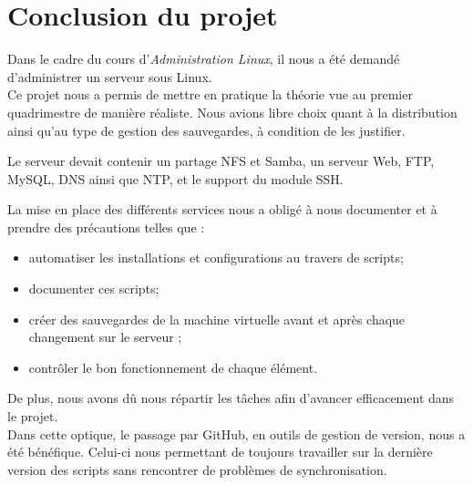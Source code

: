 \section{Conclusion du projet}
\label{sec:conclusion-projet}

Dans le cadre du cours d'\emph{Administration Linux}, il nous a été demandé
d'administrer un serveur sous Linux. \\

Ce projet nous a permis de mettre en pratique la théorie vue au premier
quadrimestre de manière réaliste. Nous avions libre choix quant à la distribution
ainsi qu'au type de gestion des sauvegardes, à condition de les justifier.

Le serveur devait contenir un partage NFS et Samba, un serveur Web, FTP, MySQL,
DNS ainsi que NTP, et le support du module SSH.

La mise en place des différents services nous a obligé à nous
documenter et à prendre des précautions telles que :
\begin{itemize}
\item automatiser les installations et configurations au travers de scripts;
\item documenter ces scripts;
\item créer des sauvegardes de la machine virtuelle avant et après chaque
changement sur le serveur ;
\item contrôler le bon fonctionnement de chaque élément. \\
\end{itemize}

De plus, nous avons dû nous répartir les tâches afin d'avancer efficacement
dans le projet. \\
Dans cette optique, le passage par GitHub, en outils de gestion
de version, nous a été bénéfique. Celui-ci nous permettant de toujours
travailler sur la dernière version des scripts sans rencontrer de problèmes de
synchronisation. \\

